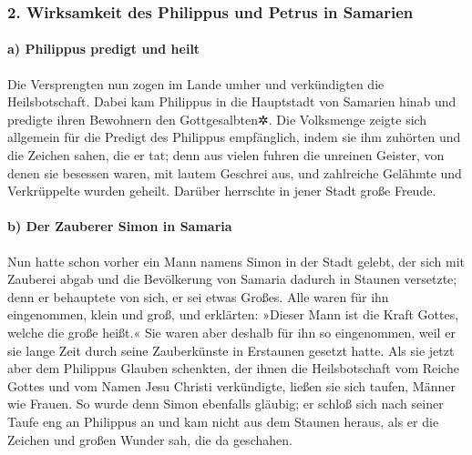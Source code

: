 \hypertarget{wirksamkeit-des-philippus-und-petrus-in-samarien}{%
\subsubsection{2. Wirksamkeit des Philippus und Petrus in
Samarien}\label{wirksamkeit-des-philippus-und-petrus-in-samarien}}

\hypertarget{a-philippus-predigt-und-heilt}{%
\paragraph{a) Philippus predigt und
heilt}\label{a-philippus-predigt-und-heilt}}

 Die Versprengten nun zogen im Lande umher und
verkündigten die Heilsbotschaft.  Dabei kam Philippus in
die Hauptstadt von Samarien hinab und predigte ihren Bewohnern den
Gottgesalbten✲.  Die Volksmenge zeigte sich allgemein für
die Predigt des Philippus empfänglich, indem sie ihm zuhörten und die
Zeichen sahen, die er tat;  denn aus vielen fuhren die
unreinen Geister, von denen sie besessen waren, mit lautem Geschrei aus,
und zahlreiche Gelähmte und Verkrüppelte wurden geheilt. 
Darüber herrschte in jener Stadt große Freude.

\hypertarget{b-der-zauberer-simon-in-samaria}{%
\paragraph{b) Der Zauberer Simon in
Samaria}\label{b-der-zauberer-simon-in-samaria}}

 Nun hatte schon vorher ein Mann namens Simon in der Stadt
gelebt, der sich mit Zauberei abgab und die Bevölkerung von Samaria
dadurch in Staunen versetzte; denn er behauptete von sich, er sei etwas
Großes.  Alle waren für ihn eingenommen, klein und groß,
und erklärten: »Dieser Mann ist die Kraft Gottes, welche die große
heißt.«  Sie waren aber deshalb für ihn so eingenommen,
weil er sie lange Zeit durch seine Zauberkünste in Erstaunen gesetzt
hatte.  Als sie jetzt aber dem Philippus Glauben
schenkten, der ihnen die Heilsbotschaft vom Reiche Gottes und vom Namen
Jesu Christi verkündigte, ließen sie sich taufen, Männer wie Frauen.
 So wurde denn Simon ebenfalls gläubig; er schloß sich
nach seiner Taufe eng an Philippus an und kam nicht aus dem Staunen
heraus, als er die Zeichen und großen Wunder sah, die da geschahen.

